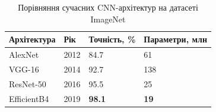 \begin{table}[H]
  \caption{Порівняння сучасних CNN-архітектур на датасеті ImageNet}
  \label{tbl:architectures}
  \centering
  \begin{tabularx}{\linewidth}{|Y|Y|Y|Y|}
    \hline
    \textbf{Архітектура} & \textbf{Рік} & \textbf{Точність, \%} & \textbf{Параметри, млн} \\ \hline
    AlexNet     & 2012 & 84.7          & 61          \\ \hline
    VGG-16      & 2014 & 92.7          & 138         \\ \hline
    ResNet-50   & 2016 & 95.5          & 25          \\ \hline
    EfficientB4 & 2019 & \textbf{98.1} & \textbf{19} \\ \hline
  \end{tabularx}
\end{table}
